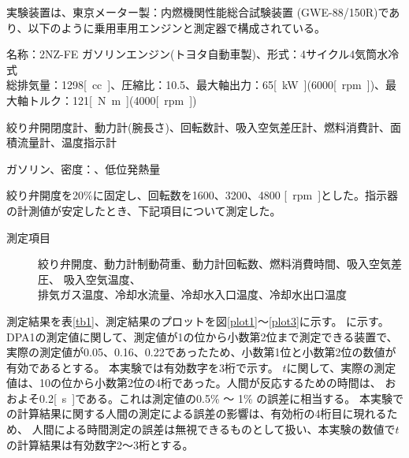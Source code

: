 実験装置は、東京メーター製：内燃機関性能総合試験装置 (GWE-88/150R)であり、以下のように乗用車用エンジンと測定器で構成されている。
\begin{description}
  \setlength{\parskip}{0cm} %
  \setlength{\itemsep}{0cm} %
  \item[試験エンジン] 名称：2NZ-FE ガソリンエンジン(トヨタ自動車製)、形式：4サイクル4気筒水冷式\\総排気量：1298\si{[cc]}、圧縮比：10.5、最大軸出力：65\si{[\kW]}(6000\si{[rpm]})、最大軸トルク：121\si{[\newton\meter]}(4000\si{[rpm]}) 
  \item [測定器] 絞り弁開閉度計、動力計(腕長さ\tsuyo{286.5\si{[\milli\meter]}})、回転数計、吸入空気差圧計、燃料消費計、面積流量計、温度指示計
  \item [使用燃料] ガソリン、密度：\tsuyo{0.72\si{[\kg/\l]}}、低位発熱量\tsuyo{46000\si{[\kJ/\kg]}}
\end{description}
絞り弁開度を20\%に固定し、回転数を1600、3200、4800 \si{[rpm]}とした。指示器の計測値が安定したとき、下記項目について測定した。
\begin{description}
  \item[測定項目] 絞り弁開度、動力計制動荷重、動力計回転数、燃料消費時間、吸入空気差圧、
  吸入空気温度、\\排気ガス温度、冷却水流量、冷却水入口温度、冷却水出口温度 
\end{description}

測定結果を表\ref{tb1}、測定結果のプロットを図\ref{plot1}～\ref{plot3}に示す。
に示す。DPA1の測定値に関して、測定値が1の位から小数第2位まで測定できる装置で、
実際の測定値が0.05、0.16、0.22であったため、小数第1位と小数第2位の数値が有効であるとする。
本実験では有効数字を3桁で示す。
$t$に関して、実際の測定値は、10の位から小数第2位の4桁であった。人間が反応するための時間は、
おおよそ0.2\si{[s]}である。これは測定値の0.5\% ～ 1\% の誤差に相当する。
本実験での計算結果に関する人間の測定による誤差の影響は、有効桁の4桁目に現れるため、
人間による時間測定の誤差は無視できるものとして扱い、本実験の数値で$t$の計算結果は有効数字2～3桁とする。

\vspace{-5truemm}
\begin{table}[h]
\centering
\caption{測定結果}
\end{table}%

